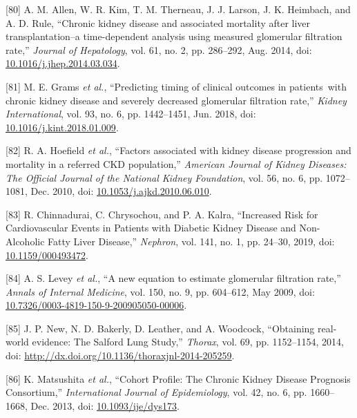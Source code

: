 \documentclass[12pt,PhD,twoside,openright]{muthesis}
\newenvironment{cslreferences}%
  {}%
  {\par}
\begin{document}
\begin{cslreferences}
\leavevmode\hypertarget{ref-allen_chronic_2014}{}%
{[}80{]} A. M. Allen, W. R. Kim, T. M. Therneau, J. J. Larson, J. K. Heimbach, and A. D. Rule, ``Chronic kidney disease and associated mortality after liver transplantation--a time-dependent analysis using measured glomerular filtration rate,'' \emph{Journal of Hepatology}, vol. 61, no. 2, pp. 286--292, Aug. 2014, doi: \href{https://doi.org/10.1016/j.jhep.2014.03.034}{10.1016/j.jhep.2014.03.034}.

\leavevmode\hypertarget{ref-grams_predicting_2018}{}%
{[}81{]} M. E. Grams \emph{et al.}, ``Predicting timing of clinical outcomes in patients~with chronic kidney disease and severely decreased glomerular filtration rate,'' \emph{Kidney International}, vol. 93, no. 6, pp. 1442--1451, Jun. 2018, doi: \href{https://doi.org/10.1016/j.kint.2018.01.009}{10.1016/j.kint.2018.01.009}.

\leavevmode\hypertarget{ref-hoefield_factors_2010}{}%
{[}82{]} R. A. Hoefield \emph{et al.}, ``Factors associated with kidney disease progression and mortality in a referred CKD population,'' \emph{American Journal of Kidney Diseases: The Official Journal of the National Kidney Foundation}, vol. 56, no. 6, pp. 1072--1081, Dec. 2010, doi: \href{https://doi.org/10.1053/j.ajkd.2010.06.010}{10.1053/j.ajkd.2010.06.010}.

\leavevmode\hypertarget{ref-chinnadurai_increased_2019-1}{}%
{[}83{]} R. Chinnadurai, C. Chrysochou, and P. A. Kalra, ``Increased Risk for Cardiovascular Events in Patients with Diabetic Kidney Disease and Non-Alcoholic Fatty Liver Disease,'' \emph{Nephron}, vol. 141, no. 1, pp. 24--30, 2019, doi: \href{https://doi.org/10.1159/000493472}{10.1159/000493472}.

\leavevmode\hypertarget{ref-levey_new_2009}{}%
{[}84{]} A. S. Levey \emph{et al.}, ``A new equation to estimate glomerular filtration rate,'' \emph{Annals of Internal Medicine}, vol. 150, no. 9, pp. 604--612, May 2009, doi: \href{https://doi.org/10.7326/0003-4819-150-9-200905050-00006}{10.7326/0003-4819-150-9-200905050-00006}.

\leavevmode\hypertarget{ref-new_obtaining_2014}{}%
{[}85{]} J. P. New, N. D. Bakerly, D. Leather, and A. Woodcock, ``Obtaining real-world evidence: The Salford Lung Study,'' \emph{Thorax}, vol. 69, pp. 1152--1154, 2014, doi: \href{https://doi.org/http://dx.doi.org/10.1136/thoraxjnl-2014-205259}{http://dx.doi.org/10.1136/thoraxjnl-2014-205259}.

\leavevmode\hypertarget{ref-matsushita_cohort_2013}{}%
{[}86{]} K. Matsushita \emph{et al.}, ``Cohort Profile: The Chronic Kidney Disease Prognosis Consortium,'' \emph{International Journal of Epidemiology}, vol. 42, no. 6, pp. 1660--1668, Dec. 2013, doi: \href{https://doi.org/10.1093/ije/dys173}{10.1093/ije/dys173}.


\end{cslreferences}
\end{document}
